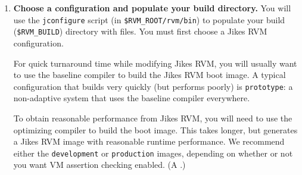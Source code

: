 \begin{enumerate}

%
We would like to use GNU  to automate this
step.  If you want to contribute to Jikes RVM, then this would be a
great project to choose.

%
%
\item {\bf Choose a configuration and populate your build directory.}
You will use the \texttt{jconfigure} script (in \texttt{\$RVM\_ROOT/rvm/bin}) to
populate your build (\texttt{\$RVM\_BUILD}) directory with files.  You must
first choose a Jikes RVM configuration.

For quick turnaround time while modifying Jikes RVM, you will usually
want to use the baseline compiler to build the Jikes RVM boot image.
A typical configuration that builds very quickly (but performs poorly)
is \texttt{prototype}: a non-adaptive system that uses the
baseline compiler everywhere.

To obtain reasonable performance from Jikes RVM, you will need to use
the optimizing compiler to build the boot image.  This takes longer,
but generates a Jikes RVM image with reasonable runtime performance.
We recommend either the \texttt{development} or \texttt{production} images,
depending on whether or not you want VM assertion checking enabled.  (A
.) 


\end{enumerate}
